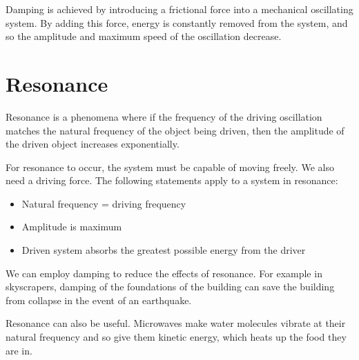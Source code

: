 \documentclass{article}
\begin{document}
Damping is achieved by introducing a frictional force into a mechanical oscillating system. By adding this force, energy is constantly removed from the system, and so the amplitude and maximum speed of the oscillation decrease.

\section*{Resonance}
Resonance is a phenomena where if the frequency of the driving oscillation matches the natural frequency of the object being driven, then the amplitude of the driven object increases exponentially.

For resonance to occur, the system must be capable of moving freely. We also need a driving force. The following statements apply to a system in resonance:
\begin{itemize}
	\item Natural frequency = driving frequency
	\item Amplitude is maximum
	\item Driven system absorbs the greatest possible energy from the driver
\end{itemize}

We can employ damping to reduce the effects of resonance. For example in skyscrapers, damping of the foundations of the building can save the building from collapse in the event of an earthquake.

Resonance can also be useful. Microwaves make water molecules vibrate at their natural frequency and so give them kinetic energy, which heats up the food they are in.
\end{document}
